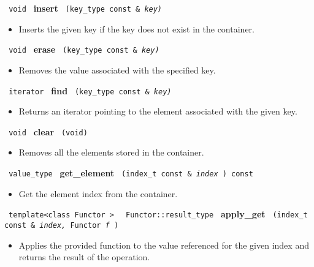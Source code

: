 \noindent
\texttt{%
void
}
\newline
\textbf{insert}%
\texttt{%
(key\_type const \&
\textit{key)}%
}

\begin{itemize}
\item
Inserts the given key if the key does not exist in the container.
\end{itemize}

\noindent
\texttt{%
void
}
\newline
\textbf{erase}%
\texttt{%
(key\_type const \&
\textit{key)}%
}

\begin{itemize}
\item
Removes the value associated with the specified key.
\end{itemize}

\noindent
\texttt{%
iterator
}
\newline
\textbf{find}%
\texttt{%
(key\_type const \&
\textit{key)}%
}

\begin{itemize}
\item
Returns an iterator pointing to the element associated with the given key.
\end{itemize}

\noindent
\texttt{%
void
}
\newline
\textbf{clear}%
\texttt{%
(void)
}

\begin{itemize}
\item
Removes all the elements stored in the container.
\end{itemize}

\noindent
\texttt{%
value\_type
}
\newline
\textbf{get\_element}%
\texttt{%
(index\_t const \&
\textit{index}%
) const
}

\begin{itemize}
\item
Get the element index from the container.
\end{itemize}

\noindent
\texttt{%
template<class Functor >
}
\texttt{%
Functor::result\_type
}
\newline
\textbf{apply\_get}%
\texttt{%
(index\_t const \&
\textit{index,}%
Functor
\textit{f}%
)
}

\begin{itemize}
\item
Applies the provided function to the value referenced for the given index and returns the result of the operation.
\end{itemize}

